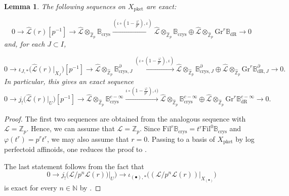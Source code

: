 \documentclass[asterisque,english]{smfart}
\newtheorem{lemma}[theo]{Lemma}
\begin{document}
\begin{lemma}\label{lemma:fundexactseq}   The following sequences on $X_{\mathrm{pket}}$ are exact:

$$0 \longrightarrow\widehat{\mathcal{L}}(r)[p^{-1}] \longrightarrow  \widehat{\mathcal{L}}\otimes_{\widehat{\mathbb{Z}}_p} \mathbb{B}_{\mathrm{crys}}  \stackrel{( \iota \circ (1-\frac{\varphi}{p^r}),\iota)}{\longrightarrow} \widehat{\mathcal{L}}\otimes_{\widehat{\mathbb{Z}}_p} \mathbb{B}_{\mathrm{crys}} \oplus \widehat{\mathcal{L}}\otimes_{\widehat{\mathbb{Z}}_p} \mathrm{Gr}^r \mathbb{B}_{\mathrm{dR}} \longrightarrow 0$$and, for each $J\subset I$, 

$$0 \to\iota_{J,\ast}\bigl(\widehat{\mathcal{L}}(r)\vert_{X_J}\bigr)[p^{-1}] \longrightarrow  \widehat{\mathcal{L}}\otimes_{\widehat{\mathbb{Z}}_p} \mathbb{B}_{\mathrm{crys},J}^\partial \stackrel{(\iota \circ (1-\frac{\varphi}{p^r}),\iota)}{\longrightarrow} \widehat{\mathcal{L}}\otimes_{\widehat{\mathbb{Z}}_p} \mathbb{B}_{\mathrm{crys},J}^\partial \oplus \widehat{\mathcal{L}}\otimes_{\widehat{\mathbb{Z}}_p} \mathrm{Gr}^r\mathbb{B}_{\mathrm{dR},J}^\partial \to 0.$$In particular, this gives an exact sequence $$0 \longrightarrow j_!\bigl(\widehat{\mathcal{L}}(r)\vert_U\bigr)[p^{-1}] \longrightarrow  \widehat{\mathcal{L}}\otimes_{\widehat{\mathbb{Z}}_p} \mathbb{B}_{\mathrm{crys}} ^{c-\infty} \stackrel{\iota\circ (1-\frac{\varphi}{p^r}),\iota)}{\longrightarrow} \widehat{\mathcal{L}}\otimes_{\widehat{\mathbb{Z}}_p} \mathbb{B}_{\mathrm{crys}}^{c-\infty}\oplus  \widehat{\mathcal{L}}\otimes_{\widehat{\mathbb{Z}}_p} \mathrm{Gr}^r\mathbb{B}_{\mathrm{dR}}^{c-\infty}  \longrightarrow 0.$$

\end{lemma}
\begin{proof} The first two  sequences are obtained from the analogous sequence with $\mathcal{L}=\mathbb{Z}_p$. Hence, we can assume that $\mathcal{L}=\mathbb{Z}_p$. Since $\mathrm{Fil}^r \mathbb{B}_{\mathrm{crys}}=t^r  \mathrm{Fil}^0 \mathbb{B}_{\mathrm{crys}} $ and $\varphi(t^r)=p^r t^r$, we may also assume that $r=0$. Passing to a basis of  $X_{\mathrm{pket}}$ by log perfectoid affinoids, one reduces the proof to  \cite[\S 6.2.2]{Brinon}.

The last statement follows from the fact that $$0 \to j_!\bigl(\mathcal{L}/p^n \mathcal{L}(r))\vert_U\bigr) \longrightarrow  \iota_{(\bullet),\ast}\bigl((\mathcal{L}/p^n \mathcal{L}(r))\vert_{X_{(\bullet)}} \bigr) $$ is exact for every $n\in \mathbb{N}$ by  \cite[Lemma 2.1.5]{LLZ}.
\end{proof}
\end{document}
